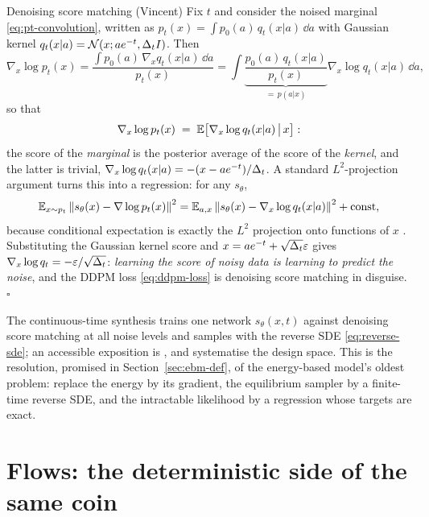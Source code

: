 \begin{toolbox}{Denoising score matching (Vincent)}
Fix $t$ and consider the noised marginal \eqref{eq:pt-convolution},
written as $p_t(x) = \int p_0(a)\, q_t(x|a)\,\dd a$ with Gaussian kernel
$q_t(x|a) = \mathcal{N}(x; a e^{-t}, \Delta_t I)$. Then
\begin{equation*}
  \nabla_x \log p_t(x)
  = \frac{\int p_0(a)\, \nabla_x q_t(x|a)\, \dd a}{p_t(x)}
  = \int \underbrace{\frac{p_0(a)\, q_t(x|a)}{p_t(x)}}_{=\,p(a|x)}
    \nabla_x \log q_t(x|a)\, \dd a ,
\end{equation*}
so that
\begin{equation*}
  \nabla_x \log p_t(x)
  \;=\; \mathbb{E}\big[ \nabla_x \log q_t(x|a) \,\big|\, x \big] :
\end{equation*}
the score of the \emph{marginal} is the posterior average of the score of
the \emph{kernel}, and the latter is trivial,
$\nabla_x \log q_t(x|a) = -(x - a e^{-t})/\Delta_t$. A standard
$L^2$-projection argument turns this into a regression: for any
$s_\theta$,
\begin{equation*}
  \mathbb{E}_{x \sim p_t} \left\lVert  s_\theta(x) - \nabla \log p_t(x)  \right\rVert^2
  = \mathbb{E}_{a, x} \left\lVert  s_\theta(x) - \nabla_x \log q_t(x|a)  \right\rVert^2
  + \text{const},
\end{equation*}
because conditional expectation is exactly the $L^2$ projection onto
functions of $x$ \citep{vincent2011connection}. Substituting the Gaussian
kernel score and $x = a e^{-t} + \sqrt{\Delta_t}\varepsilon$ gives
$\nabla_x \log q_t = -\varepsilon / \sqrt{\Delta_t}$: \emph{learning the
score of noisy data is learning to predict the noise}, and the DDPM loss
\eqref{eq:ddpm-loss} is denoising score matching in disguise.
\hfill$\square$
\end{toolbox}

The continuous-time synthesis \citep{song2019generative,
song2021scorebased} trains one network $s_\theta(x, t)$ against denoising
score matching at all noise levels and samples with the reverse SDE
\eqref{eq:reverse-sde}; an accessible exposition is \citet{song2021blog},
and \citet{karras2022elucidating} systematise the design space. This is
the resolution, promised in Section~\ref{sec:ebm-def}, of the
energy-based model's oldest problem: \citeauthor{song2019generative}
replace the energy by its gradient, the equilibrium sampler by a
finite-time reverse SDE, and the intractable likelihood by a regression
whose targets are exact.

\section{Flows: the deterministic side of the same coin}\label{sec:flows}


